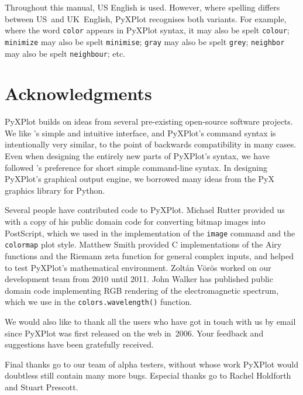 Throughout this manual, US English is used. However, where spelling differs
between US~and UK~English, PyXPlot recognises both variants. For example, where
the word \texttt{color} appears in PyXPlot syntax, it may also be spelt
\texttt{colour}; \texttt{minimize} may also be spelt \texttt{minimise};
\texttt{gray} may also be spelt \texttt{grey}; \texttt{neighbor} may also be
spelt \texttt{neighbour}; etc.

\section{Acknowledgments}

PyXPlot builds on ideas from several pre-existing open-source software
projects. We like \gnuplot's simple and intuitive interface, and PyXPlot's
command syntax is intentionally very similar, to the point of backwards
compatibility in many cases. Even when designing the entirely new parts of
PyXPlot's syntax, we have followed \gnuplot's preference for short simple
command-line syntax. In designing PyXPlot's graphical output engine, we
borrowed many ideas from the PyX graphics library for Python.

Several people have contributed code to PyXPlot. Michael Rutter provided us 
with a copy of his public domain code for converting bitmap images into
PostScript, which we used in the implementation of the {\tt image} command and
the {\tt colormap} plot style. Matthew Smith provided C implementations of the
Airy functions and the Riemann zeta function for general complex inputs, and
helped to test PyXPlot's mathematical environment. Zolt\'an V\"or\"os worked on
our development team from 2010 until 2011.  John Walker has published public
domain code implementing RGB rendering of the electromagnetic spectrum, which
we use in the {\tt colors.\-wave\-length()} function.

We would also like to thank all the users who have got in touch with us by
email since PyXPlot was first released on the web in~2006. Your feedback and
suggestions have been gratefully received.

Final thanks go to our team of alpha testers, without whose work PyXPlot would
doubtless still contain many more bugs.  Especial thanks go to Rachel Holdforth
and Stuart Prescott.

